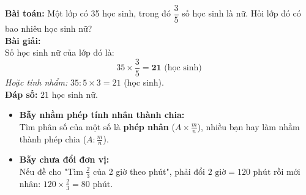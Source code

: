 \documentclass[14pt,a4paper,oneside]{extbook}
\begin{document}
\vspace{-2.5mm}
\noindent
\begin{minipage}[t]{0.49\textwidth}\vspace{0pt}
\begin{tcolorbox}[
  enhanced,
  colback=green!4!white,
  colframe=green!60!black,
  arc=2mm, boxrule=0.8pt,
  left=2mm, right=2mm, top=1.8mm, bottom=1.8mm,
  title={\footnotesize\bfseries\color{white}\faCheckCircle\ Ví dụ thực hành chuẩn mực}
]
{\footnotesize
\textbf{Bài toán:} Một lớp có 35 học sinh, trong đó $\dfrac{3}{5}$ số học sinh là nữ. Hỏi lớp đó có bao nhiêu học sinh nữ?\\
\textbf{Bài giải:}\\
Số học sinh nữ của lớp đó là:
$$35 \times \dfrac{3}{5} = \mathbf{21} \text{ (học sinh)}$$
\textit{Hoặc tính nhẩm:} $35 : 5 \times 3 = 21$ (học sinh).\\
\textbf{Đáp số:} $21$ học sinh nữ.
}
\end{tcolorbox}
\end{minipage}
\hfill
\begin{minipage}[t]{0.49\textwidth}\vspace{0pt}
\begin{tcolorbox}[
  enhanced,
  colback=red!4!white,
  colframe=red!70!black,
  arc=2mm, boxrule=0.8pt,
  left=2mm, right=2mm, top=1.8mm, bottom=1.8mm,
  title={\footnotesize\bfseries\color{white}\faExclamationTriangle\ Mẹo tránh bẫy trắc nghiệm}
]
{\footnotesize
\begin{itemize}\setlength{\itemsep}{1.5pt}\setlength{\leftskip}{-2.5mm}
  \item \textbf{Bẫy nhầm phép tính nhân thành chia:}\\
  Tìm phân số của một số là \textbf{phép nhân} ($A \times \frac{m}{n}$), nhiều bạn hay làm nhầm thành phép chia ($A : \frac{m}{n}$).
  \item \textbf{Bẫy chưa đổi đơn vị:}\\
  Nếu đề cho "Tìm $\frac{2}{3}$ của 2 giờ theo phút", phải đổi $2\text{ giờ} = 120\text{ phút}$ rồi mới nhân: $120 \times \frac{2}{3} = 80\text{ phút}$.
\end{itemize}
}
\end{tcolorbox}
\end{minipage}
\end{document}
